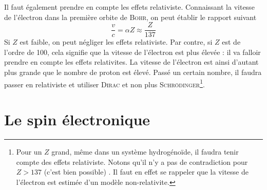 Il faut également prendre en compte les effets relativiste. Connaissant la vitesse de l'électron dans 
la première orbite de \textsc{Bohr}, on peut établir le rapport suivant
\begin{equation}
\frac{v}{c} = \alpha Z \approx \frac{Z}{137}
\end{equation}
Si $Z$ est faible, on peut négliger les effets relativiste. Par contre, si $Z$ est de l'ordre de 100, cela
signifie que la vitesse de l'électron est plus élevée : il va falloir prendre en compte les effets 
relativites. La vitesse de l'électron est ainsi d'autant plus grande que le nombre de proton est élevé. 
Passé un certain nombre, il faudra passer en relativiste et utiliser \textsc{Dirac} et non plus
\textsc{Schrödinger}\footnote{Pour un $Z$ grand, même dans un système hydrogénoïde, il faudra tenir compte
des effets relativiste. Notons qu'il n'y a pas de contradiction pour $Z>137$ (c'est bien possible) . Il 
faut en effet se rappeler que la vitesse de l'électron est estimée d'un modèle non-relativite.}.


\section{Le spin électronique}
